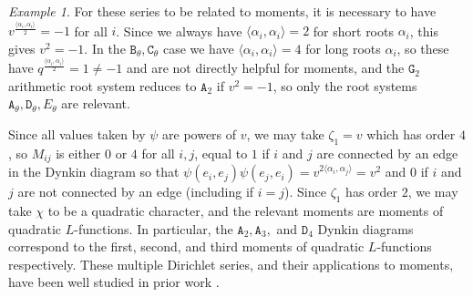 \documentclass[11pt,letterpaper]{article}
\theoremstyle{definition}
\theoremstyle{remark}
\newtheorem{example}[theorem]{Example}
\numberwithin{equation}{section}
\theoremstyle{dotless}
\newcommand{\hchi}{\psi} %
\newcommand{\gene}{\zeta_1} %
\newcommand{\qv}{v}
\begin{document}
\begin{example}
 For these series to be related to moments, it is necessary to have $\qv^{ \frac{\langle \alpha_i, \alpha_i \rangle}{2}}=-1$ for all $i$. Since we always have $\langle \alpha_i, \alpha_i \rangle=2$ for short roots $\alpha_i$, this gives $\qv^2=-1$. In the $\mathtt B_\theta,\mathtt C_\theta$ case we have $\langle \alpha_i, \alpha_i \rangle =4$ for long roots $\alpha_i$, so these have $q^{ \frac{\langle \alpha_i, \alpha_i \rangle}{2}}=1\neq -1$ and are not directly helpful for moments, and the $\mathtt G_2$ arithmetic root system reduces to $\mathtt A_2$ if $\qv^2=-1$, so only the root systems $\mathtt A_\theta, \mathtt D_\theta, E_\theta$ are relevant.

 Since all values taken by $\psi$ are powers of $\qv$, we may take $\gene=\qv$ which has order $4$, so $M_{ij}$ is either $0$ or $4$ for all $i,j$, equal to $1$ if $i$ and $j$ are connected by an edge in the Dynkin diagram so that $\hchi(e_i,e_j) \hchi(e_j,e_i) = \qv^{2 \langle \alpha_i,\alpha_j\rangle}= \qv^2$ and $0$ if $i$ and $j$ are not connected by an edge (including if $i=j$). Since $\gene$ has order $2$, we may take $\chi$ to be a quadratic character, and the relevant moments are moments of quadratic $L$-functions. In particular, the $\mathtt A_2, \mathtt A_3,$ and $\mathtt D_4$ Dynkin diagrams correspond to the first, second, and third moments of quadratic $L$-functions respectively. These multiple Dirichlet series, and their applications to moments, have been well studied in prior work \cite{DiaconuGoldfeldHoffstein, Diaconu, DiaconuWhitehead}.\end{example} 
\end{document}
